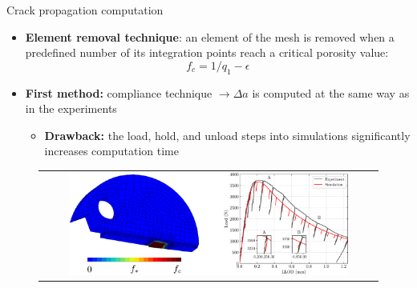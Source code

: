 \documentclass[9pt]{beamer}
\begin{document}

\begin{frame}{Crack propagation computation}

\begin{itemize}
	\item \textbf{Element removal technique}: an element of the mesh is removed when a predefined number of its integration points reach a critical porosity value:
	\vspace{0.15cm}
	$$ f_c = 1/q_1 - \epsilon$$	
	\vspace{0.05cm}
	\item \textbf{First method:} compliance technique $\rightarrow \Delta a$ is computed at the same way as in the experiments
	\vspace{0.15cm}
	\begin{itemize}
	\item \textbf{Drawback:} the load, hold, and unload steps into simulations significantly increases computation time
	\end{itemize}
\end{itemize}

\vspace{0.15cm}

\begin{figure}
        \begin{tabular}{c}
            \includegraphics[width=0.85\textwidth]{Images/plot_Load_CMOD_Tfake_edt.pdf} \\
        \end{tabular}
    \end{figure}

\end{frame}

\end{document}
